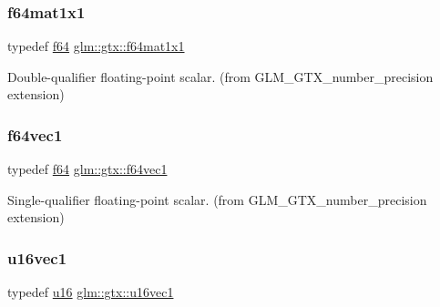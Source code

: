 \subsubsection{\texorpdfstring{f64mat1x1}{f64mat1x1}}
{\footnotesize\ttfamily typedef \mbox{\hyperlink{group__gtc__type__precision_ga2bba392e555124b36cde6abba349bab3}{f64}} \mbox{\hyperlink{group__gtx__number__precision_ga710a5952d78b22635c71c5fc2c0a3319}{glm\+::gtx\+::f64mat1x1}}}



Double-\/qualifier floating-\/point scalar. (from G\+L\+M\+\_\+\+G\+T\+X\+\_\+number\+\_\+precision extension) 

\mbox{\label{group__gtx__number__precision_ga44336a26c958d66efdfb5a6c114c538e}} 
\subsubsection{\texorpdfstring{f64vec1}{f64vec1}}
{\footnotesize\ttfamily typedef \mbox{\hyperlink{group__gtc__type__precision_ga2bba392e555124b36cde6abba349bab3}{f64}} \mbox{\hyperlink{group__gtx__number__precision_ga44336a26c958d66efdfb5a6c114c538e}{glm\+::gtx\+::f64vec1}}}



Single-\/qualifier floating-\/point scalar. (from G\+L\+M\+\_\+\+G\+T\+X\+\_\+number\+\_\+precision extension) 

\mbox{\label{group__gtx__number__precision_ga807d7e5f24e981b1575bd40ca159781d}} 
\subsubsection{\texorpdfstring{u16vec1}{u16vec1}}
{\footnotesize\ttfamily typedef \mbox{\hyperlink{group__gtc__type__precision_gae7a1571503f83d2264ddfa705a6b082a}{u16}} \mbox{\hyperlink{group__gtx__number__precision_ga807d7e5f24e981b1575bd40ca159781d}{glm\+::gtx\+::u16vec1}}}



